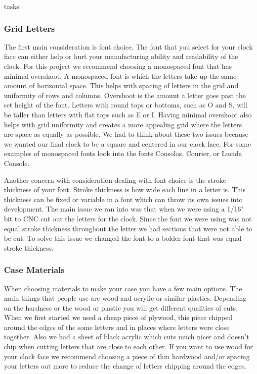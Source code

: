 tasks\documentclass[onecolumn, draftclsnofoot,10pt, compsoc]{IEEEtran}
\begin{document}
\subsubsection{Grid Letters}
The first main consideration is font choice.
The font that you select for your clock face can either help or hurt your manufacturing ability and readability of the clock.
For this project we recommend choosing a monospaced font that has minimal overshoot.
A monospaced font is which the letters take up the same amount of horizontal space.
This helps with spacing of letters in the grid and uniformity of rows and columns.
Overshoot is the amount a letter goes past the set height of the font.
Letters with round tops or bottoms, such as O and S, will be taller than letters with flat tops such as E or I.
Having minimal overshoot also helps with grid uniformity and creates a more appealing grid where the letters are space as equally as possible.
We had to think about these two issues because we wanted our final clock to be a square and centered in our clock face.
For some examples of monospaced fonts look into the fonts Consolas, Courier, or Lucida Console.

Another concern with consideration dealing with font choice is the stroke thickness of your font.
Stroke thickness is how wide each line in a letter is.
This thickness can be fixed or variable in a font which can throw its own issues into development.
The main issue we ran into was that when we were using a 1/16" bit to CNC cut out the letters for the clock.
Since the font we were using was not equal stroke thickness throughout the letter we had sections that were not able to be cut.
To solve this issue we changed the font to a bolder font that was equal stroke thickness.

\subsubsection{Case Materials}
When choosing materials to make your case you have a few main options.
The main things that people use are wood and acrylic or similar plastics.
Depending on the hardness or the wood or plastic you will get different qualities of cuts.
When we first started we used a cheap piece of plywood, this piece chipped around the edges of the some letters and in places where letters were close together.
Also we had a sheet of black acrylic which cuts much nicer and doesn't chip when cutting letters that are close to each other.
If you want to use wood for your clock face we recommend choosing a piece of thin hardwood and/or spacing your letters out more to reduce the change of letters chipping around the edges.
\end{document}
